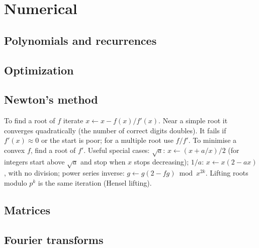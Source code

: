 \chapter{Numerical}

\section{Polynomials and recurrences}

\section{Optimization}

\section{Newton's method}
  To find a root of $f$ iterate $x \leftarrow x - f(x)/f'(x)$. Near a simple root it converges
  quadratically (the number of correct digits doubles). It fails if $f'(x) \approx 0$ or the start is
  poor; for a multiple root use $f/f'$. To minimise a convex $f$, find a root of $f'$.
  Useful special cases: $\sqrt a$: $x \leftarrow (x + a/x)/2$ (for integers start above $\sqrt a$ and stop when $x$ stops decreasing);
  $1/a$: $x \leftarrow x(2 - ax)$, with no division; power series inverse: $g \leftarrow g(2 - fg) \bmod x^{2k}$.
  Lifting roots modulo $p^k$ is the same iteration (Hensel lifting).

\section{Matrices}

\section{Fourier transforms}
